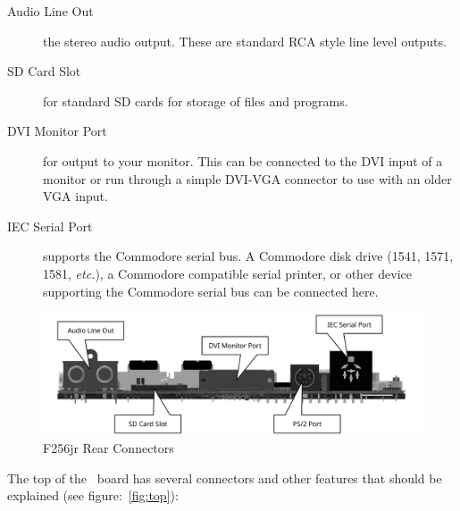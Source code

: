 \begin{description}
    \item[Audio Line Out] the stereo audio output. These are standard RCA style line level outputs.

    \item[SD Card Slot] for standard SD cards for storage of files and programs.

    \item[DVI Monitor Port] for output to your monitor. This can be connected to the DVI input of a monitor or run through a simple DVI-VGA connector to use with an older VGA input.

    \item[IEC Serial Port] supports the Commodore serial bus. A Commodore disk drive (1541, 1571, 1581, {\it etc.}), a Commodore compatible serial printer, or other device supporting the Commodore serial bus can be connected here.
\end{description}

\begin{figure}[ht]
    \begin{center}
        \includegraphics[scale=0.75]{images/f256_render_annotated_back.pdf}
    \end{center}
    \caption{F256jr Rear Connectors}
    \label{fig:rear}
\end{figure}


The top of the \fjr\ board has several connectors and other features that should be explained (see figure:~\ref{fig:top}):

